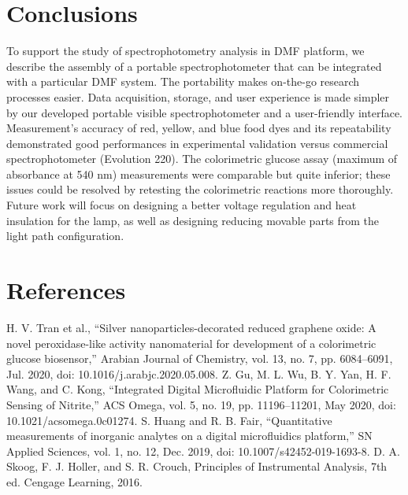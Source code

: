 \documentclass[conference]{IEEEtran}
\begin{document}
\section{Conclusions}
To support the study of spectrophotometry analysis in DMF platform, we describe the assembly of a portable spectrophotometer that can be integrated with a particular DMF system.
The portability makes on-the-go research processes easier.
Data acquisition, storage, and user experience is made simpler by our developed portable visible spectrophotometer and a user-friendly interface.
Measurement's accuracy of red, yellow, and blue food dyes and its repeatability demonstrated good performances in experimental validation versus commercial spectrophotometer (Evolution 220).
The colorimetric glucose assay (maximum of absorbance at 540 nm) measurements were comparable but quite inferior; these issues could be resolved by retesting the colorimetric reactions more thoroughly.
Future work will focus on designing a better voltage regulation and heat insulation for the lamp, as well as designing reducing movable parts from the light path configuration.

\section*{References}


\begin{thebibliography}{00}
 H. V. Tran et al., “Silver nanoparticles-decorated reduced graphene oxide: A novel peroxidase-like activity nanomaterial for development of a colorimetric glucose biosensor,” Arabian Journal of Chemistry, vol. 13, no. 7, pp. 6084–6091, Jul. 2020, doi: 10.1016/j.arabjc.2020.05.008.
 Z. Gu, M. L. Wu, B. Y. Yan, H. F. Wang, and C. Kong, “Integrated Digital Microfluidic Platform for Colorimetric Sensing of Nitrite,” ACS Omega, vol. 5, no. 19, pp. 11196–11201, May 2020, doi: 10.1021/acsomega.0c01274.
 S. Huang and R. B. Fair, “Quantitative measurements of inorganic analytes on a digital microfluidics platform,” SN Applied Sciences, vol. 1, no. 12, Dec. 2019, doi: 10.1007/s42452-019-1693-8.
 D. A. Skoog, F. J. Holler, and S. R. Crouch, Principles of Instrumental Analysis, 7th ed. Cengage Learning, 2016.
\end{thebibliography}
\end{document}
